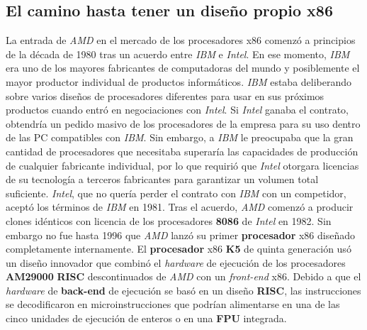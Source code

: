 \subsection{El camino hasta tener un diseño propio x86}
La entrada de \emph{AMD} en el mercado de los procesadores x86 comenzó a principios de la década de 1980 tras un acuerdo entre \emph{IBM} e \emph{Intel}. En ese momento, \emph{IBM}
era uno de los mayores fabricantes de computadoras del mundo y posiblemente el mayor productor individual de productos informáticos. \emph{IBM} estaba deliberando sobre varios diseños
de procesadores diferentes para usar en sus próximos productos cuando entró en negociaciones con \emph{Intel}. Si \emph{Intel} ganaba el contrato, obtendría un pedido masivo de los
procesadores de la empresa para su uso dentro de las PC compatibles con \emph{IBM}. Sin embargo, a \emph{IBM} le preocupaba que la gran cantidad de procesadores que necesitaba
superaría las capacidades de producción de cualquier fabricante individual, por lo que requirió que \emph{Intel} otorgara licencias de su tecnología a terceros fabricantes
para garantizar un volumen total suficiente. \emph{Intel}, que no quería perder el contrato con \emph{IBM} con un competidor, aceptó los términos de \emph{IBM} en 1981. Tras el acuerdo,
\emph{AMD} comenzó a producir clones idénticos con licencia de los procesadores \textbf{8086} de \emph{Intel} en 1982. Sin embargo no fue hasta 1996 que \emph{AMD} lanzó su primer
\textbf{procesador} x86 diseñado completamente internamente. El \textbf{procesador} x86 \textbf{K5} de quinta generación usó un diseño innovador que combinó el \emph{hardware} de
ejecución de los procesadores \textbf{AM29000} \textbf{RISC} descontinuados de \emph{AMD} con un \emph{front-end} x86. Debido a que el \emph{hardware} de \textbf{back-end} de ejecución
se basó en un diseño \textbf {RISC}, las instrucciones se decodificaron en microinstrucciones que podrían alimentarse en una de las cinco unidades de ejecución de enteros o en una
\textbf{FPU} integrada.

